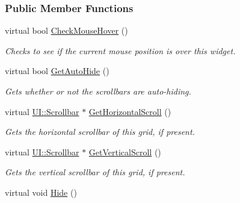 \subsubsection*{Public Member Functions}
\begin{DoxyCompactItemize}
\item 
virtual bool \hyperlink{classphys_1_1UI_1_1ScrolledCellGrid_a976e99e204f912d82712872e4e80b833}{CheckMouseHover} ()
\begin{DoxyCompactList}\small\item\em Checks to see if the current mouse position is over this widget. \item\end{DoxyCompactList}\item 
virtual bool \hyperlink{classphys_1_1UI_1_1ScrolledCellGrid_ac45c0e5d0ecd6f032bfa2ec630394b96}{GetAutoHide} ()
\begin{DoxyCompactList}\small\item\em Gets whether or not the scrollbars are auto-\/hiding. \item\end{DoxyCompactList}\item 
virtual \hyperlink{classphys_1_1UI_1_1Scrollbar}{UI::Scrollbar} $\ast$ \hyperlink{classphys_1_1UI_1_1ScrolledCellGrid_a32bad5e7312430285d93a9beee06a12b}{GetHorizontalScroll} ()
\begin{DoxyCompactList}\small\item\em Gets the horizontal scrollbar of this grid, if present. \item\end{DoxyCompactList}\item 
virtual \hyperlink{classphys_1_1UI_1_1Scrollbar}{UI::Scrollbar} $\ast$ \hyperlink{classphys_1_1UI_1_1ScrolledCellGrid_afcc80eceed64b8dac28832d4effade31}{GetVerticalScroll} ()
\begin{DoxyCompactList}\small\item\em Gets the vertical scrollbar of this grid, if present. \item\end{DoxyCompactList}\item 
\hypertarget{classphys_1_1UI_1_1ScrolledCellGrid_a489a88ad115f0059dabb4519f6139bd8}{
virtual void \hyperlink{classphys_1_1UI_1_1ScrolledCellGrid_a489a88ad115f0059dabb4519f6139bd8}{Hide} ()}
\label{classphys_1_1UI_1_1ScrolledCellGrid_a489a88ad115f0059dabb4519f6139bd8}


\end{DoxyCompactItemize}
